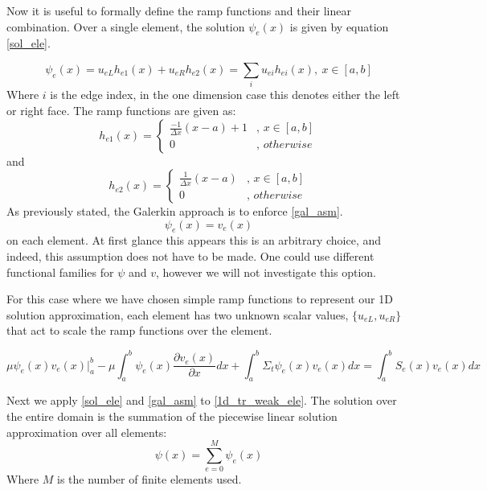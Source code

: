 Now it is useful to formally define the ramp functions and their linear combination.  Over a single element, the solution $\psi_e(x)$ is given by equation \ref{sol_ele}.

\begin{equation}
\psi_e(x) = u_{eL}h_{e1}(x) + u_{eR}h_{e2}(x) = \sum_i u_{ei} h_{ei}(x),\ x\in[a,b]
\label{sol_ele}
\end{equation}
Where $i$ is the edge index, in the one dimension case this denotes either the left or right face.
The ramp functions are given as:
\begin{equation}
  h_{e1}(x) =
  \begin{cases}
                                   \frac{-1}{\Delta x}(x-a) + 1 & \text{, $x\in[a,b]$} \\
                                   0 & \text{, $otherwise$} 
  \end{cases}
\end{equation}
and
\begin{equation}
  h_{e2}(x) =
  \begin{cases}
                                   \frac{1}{\Delta x}(x-a) & \text{, $x\in[a,b]$} \\
                                   0 & \text{, $otherwise$} 
  \end{cases}
\end{equation}
As previously stated, the Galerkin approach is to enforce \ref{gal_asm}.
\begin{equation}
\psi_e(x) = v_e(x)
\label{gal_asm}
\end{equation}
on each element.  At first glance this appears this is an arbitrary choice, and indeed, this assumption does not have to be made.  One could use different functional families for $\psi$ and $v$, however we will not investigate this option.

For this case where we have chosen simple ramp functions to represent our 1D solution approximation, each element has two unknown scalar values, $\{u_{eL}, u_{eR}\}$ that act to scale the ramp functions over the element.

\begin{equation}
\mu \psi_e(x)v_e(x)|_a^b- \mu \int_a^b  \psi_e(x) \frac{\partial v_e(x)}{\partial x} dx + \int_a^b \Sigma_t \psi_e(x)v_e(x) dx =  \int_a^b S_e(x)v_e(x) dx
\label{1d_tr_weak_ele}
\end{equation}

Next we apply \ref{sol_ele} and \ref{gal_asm} to \ref{1d_tr_weak_ele}.
The solution over the entire domain is the summation of the piecewise linear solution approximation over all elements:
\begin{equation}
\psi(x) = \sum_{e=0}^M \psi_e(x) 
\end{equation} 
Where $M$ is the number of finite elements used.
 
